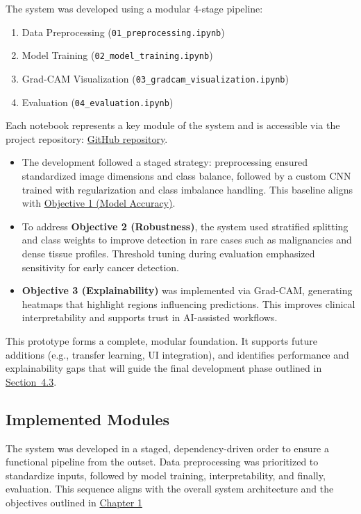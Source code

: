 \documentclass[12pt]{article}
\begin{document}
The system was developed using a modular 4-stage pipeline:
\begin{enumerate}
    \item Data Preprocessing (\texttt{01\_preprocessing.ipynb})
    \item Model Training (\texttt{02\_model\_training.ipynb})
    \item Grad-CAM Visualization (\texttt{03\_gradcam\_visualization.ipynb})
    \item Evaluation (\texttt{04\_evaluation.ipynb})
\end{enumerate}

Each notebook represents a key module of the system and is accessible via the project repository: \href{https://github.com/justinlim00/FYP-Overview25/tree/main/FYP%20Project/FYP%20Project%20Code%20V1/notebooks}{GitHub repository}.

\begin{itemize}
    \item The development followed a staged strategy: preprocessing ensured standardized image dimensions and class balance, followed by a custom CNN trained with regularization and class imbalance handling. This baseline aligns with \hyperref[sec:objectives]{Objective 1 (Model Accuracy)}.
    
    \item To address \textbf{Objective 2 (Robustness)}, the system used stratified splitting and class weights to improve detection in rare cases such as malignancies and dense tissue profiles. Threshold tuning during evaluation emphasized sensitivity for early cancer detection.

    \item \textbf{Objective 3 (Explainability)} was implemented via Grad-CAM, generating heatmaps that highlight regions influencing predictions. This improves clinical interpretability and supports trust in AI-assisted workflows.
\end{itemize}

This prototype forms a complete, modular foundation. It supports future additions (e.g., transfer learning, UI integration), and identifies performance and explainability gaps that will guide the final development phase outlined in \hyperref[improvements]{Section~4.3}.

\subsection{Implemented Modules}
The system was developed in a staged, dependency-driven order to ensure a functional pipeline from the outset. Data preprocessing was prioritized to standardize inputs, followed by model training, interpretability, and finally, evaluation. This sequence aligns with the overall system architecture and the objectives outlined in \hyperref[chapter1]{Chapter 1}
\end{document}
